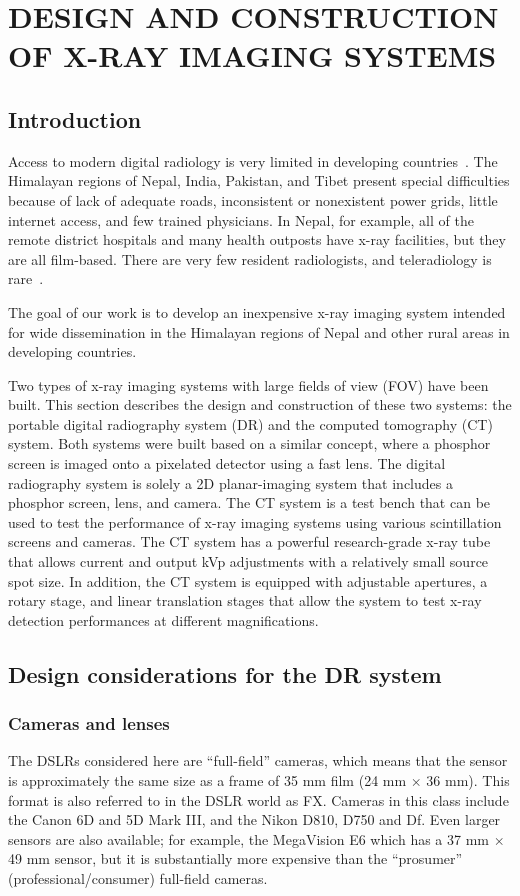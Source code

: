 \chapter{DESIGN AND CONSTRUCTION OF X-RAY IMAGING SYSTEMS}
\label{chap:design_construction}

\section{Introduction}
Access to modern digital radiology is very limited in developing countries~\citep{telehealth2009}. The Himalayan regions of Nepal, India, Pakistan, and Tibet present special difficulties because of lack of adequate roads, inconsistent or nonexistent power grids, little internet access, and few trained physicians. In Nepal, for example, all of the remote district hospitals and many health outposts have x-ray facilities, but they are all film-based. There are very few resident radiologists, and teleradiology is rare~\citep{telehealth2009, Graham2003}.

The goal of our work is to develop an inexpensive x-ray imaging system intended for wide dissemination in the Himalayan regions of Nepal and other rural areas in developing countries.

Two types of x-ray imaging systems with large fields of view (FOV) have been built.  This section describes the design and construction of these two systems: the portable digital radiography system (DR) and the computed tomography (CT) system.  Both systems were built based on a similar concept, where a phosphor screen is imaged onto a pixelated detector using a fast lens.  The digital radiography system is solely a 2D planar-imaging system that includes a phosphor screen, lens, and camera.  The CT system is a test bench that can be used to test the performance of x-ray imaging systems using various scintillation screens and cameras.  The CT system has a powerful research-grade x-ray tube that allows current and output kVp adjustments with a relatively small source spot size.  In addition, the CT system is equipped with adjustable apertures, a rotary stage, and linear translation stages that allow the system to test x-ray detection performances at different magnifications.

\section{Design considerations for the DR system}
\label{sect:design_considerations_for_DR}
\subsection{Cameras and lenses}
\label{subsect:camera_lenses}
The DSLRs considered here are ``full-field'' cameras, which means that the sensor is approximately the same size as a frame of 35 mm film (24 mm $\times$ 36 mm).  This format is also referred to in the DSLR world as FX. Cameras in this class include the Canon 6D and 5D Mark III, and the Nikon D810, D750 and Df. Even larger sensors are also available; for example, the MegaVision E6 which has a 37 mm $\times$ 49 mm sensor, but it is substantially more expensive than the ``prosumer'' (professional/consumer) full-field cameras.

